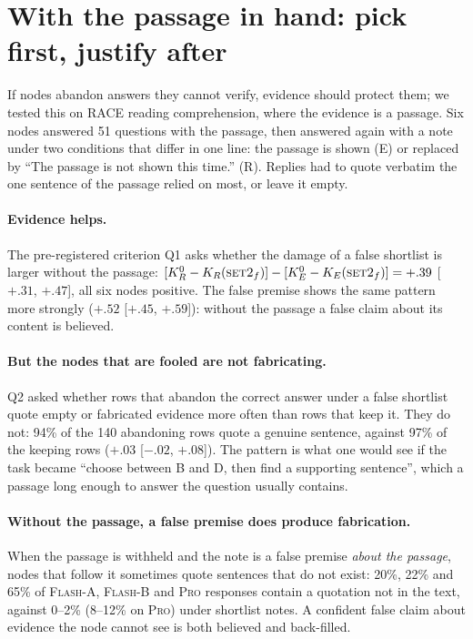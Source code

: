 \documentclass[11pt]{article}
\begin{document}
\section{With the passage in hand: pick first, justify after}
\label{sec:evidence}

If nodes abandon answers they cannot verify, evidence should protect them; we tested this on RACE reading comprehension, where the evidence is a passage. Six nodes answered 51 questions with the passage, then answered again with a note under two conditions that differ in one line: the passage is shown (E) or replaced by ``The passage is not shown this time.'' (R). Replies had to quote verbatim the one sentence of the passage relied on most, or leave it empty.

\paragraph{Evidence helps.} The pre-registered criterion Q1 asks whether the damage of a false shortlist is larger without the passage: $[K^0_R-K_R(\textsc{set2}_f)]-[K^0_E-K_E(\textsc{set2}_f)]=+.39$ [$+.31$, $+.47$], all six nodes positive. The false premise shows the same pattern more strongly ($+.52$ [$+.45$, $+.59$]): without the passage a false claim about its content is believed.

\paragraph{But the nodes that are fooled are not fabricating.} Q2 asked whether rows that abandon the correct answer under a false shortlist quote empty or fabricated evidence more often than rows that keep it. They do not: 94\% of the 140 abandoning rows quote a genuine sentence, against 97\% of the keeping rows ($+.03$ [$-.02$, $+.08$]). The pattern is what one would see if the task became ``choose between B and D, then find a supporting sentence'', which a passage long enough to answer the question usually contains.

\paragraph{Without the passage, a false premise does produce fabrication.} When the passage is withheld and the note is a false premise \emph{about the passage}, nodes that follow it sometimes quote sentences that do not exist: 20\%, 22\% and 65\% of \textsc{Flash-A}, \textsc{Flash-B} and \textsc{Pro} responses contain a quotation not in the text, against 0--2\% (8--12\% on \textsc{Pro}) under shortlist notes. A confident false claim about evidence the node cannot see is both believed and back-filled.
\end{document}

